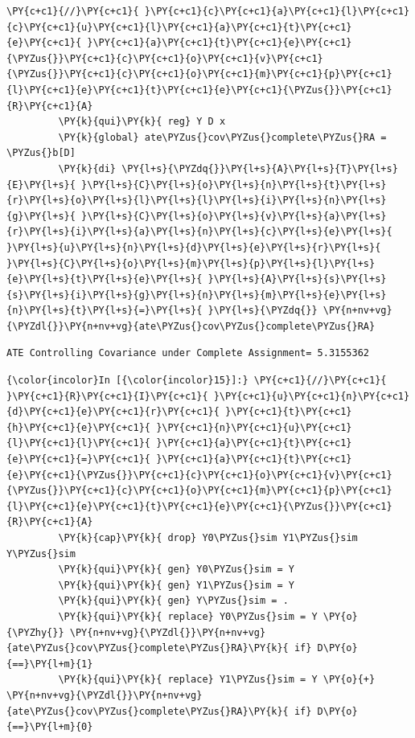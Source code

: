 \documentclass[11pt,notitlepage]{article}\usepackage[]{graphicx}\usepackage[]{color}
\makeatletter
\newenvironment{kframe}{%
 \def\at@end@of@kframe{}%
 \ifinner\ifhmode%
  \def\at@end@of@kframe{\end{minipage}}%
  \begin{minipage}{\columnwidth}%
 \fi\fi%
 \def\FrameCommand##1{\hskip\@totalleftmargin \hskip-\fboxsep
 \colorbox{shadecolor}{##1}\hskip-\fboxsep
     \hskip-\linewidth \hskip-\@totalleftmargin \hskip\columnwidth}%
 \MakeFramed {\advance\hsize-\width
   \@totalleftmargin\z@ \linewidth\hsize
   \@setminipage}}%
 {\par\unskip\endMakeFramed%
 \at@end@of@kframe}
\newenvironment{knitrout}{}{} %
\makeatother
\begin{document}
\begin{enumerate}[a)]
\begin{knitrout}
\begin{kframe}
\begin{Verbatim}[commandchars=\\\{\}]
         \PY{c+c1}{//}\PY{c+c1}{ }\PY{c+c1}{c}\PY{c+c1}{a}\PY{c+c1}{l}\PY{c+c1}{c}\PY{c+c1}{u}\PY{c+c1}{l}\PY{c+c1}{a}\PY{c+c1}{t}\PY{c+c1}{e}\PY{c+c1}{ }\PY{c+c1}{a}\PY{c+c1}{t}\PY{c+c1}{e}\PY{c+c1}{\PYZus{}}\PY{c+c1}{c}\PY{c+c1}{o}\PY{c+c1}{v}\PY{c+c1}{\PYZus{}}\PY{c+c1}{c}\PY{c+c1}{o}\PY{c+c1}{m}\PY{c+c1}{p}\PY{c+c1}{l}\PY{c+c1}{e}\PY{c+c1}{t}\PY{c+c1}{e}\PY{c+c1}{\PYZus{}}\PY{c+c1}{R}\PY{c+c1}{A}
         \PY{k}{qui}\PY{k}{ reg} Y D x
         \PY{k}{global} ate\PYZus{}cov\PYZus{}complete\PYZus{}RA = \PYZus{}b[D]
         \PY{k}{di} \PY{l+s}{\PYZdq{}}\PY{l+s}{A}\PY{l+s}{T}\PY{l+s}{E}\PY{l+s}{ }\PY{l+s}{C}\PY{l+s}{o}\PY{l+s}{n}\PY{l+s}{t}\PY{l+s}{r}\PY{l+s}{o}\PY{l+s}{l}\PY{l+s}{l}\PY{l+s}{i}\PY{l+s}{n}\PY{l+s}{g}\PY{l+s}{ }\PY{l+s}{C}\PY{l+s}{o}\PY{l+s}{v}\PY{l+s}{a}\PY{l+s}{r}\PY{l+s}{i}\PY{l+s}{a}\PY{l+s}{n}\PY{l+s}{c}\PY{l+s}{e}\PY{l+s}{ }\PY{l+s}{u}\PY{l+s}{n}\PY{l+s}{d}\PY{l+s}{e}\PY{l+s}{r}\PY{l+s}{ }\PY{l+s}{C}\PY{l+s}{o}\PY{l+s}{m}\PY{l+s}{p}\PY{l+s}{l}\PY{l+s}{e}\PY{l+s}{t}\PY{l+s}{e}\PY{l+s}{ }\PY{l+s}{A}\PY{l+s}{s}\PY{l+s}{s}\PY{l+s}{i}\PY{l+s}{g}\PY{l+s}{n}\PY{l+s}{m}\PY{l+s}{e}\PY{l+s}{n}\PY{l+s}{t}\PY{l+s}{=}\PY{l+s}{ }\PY{l+s}{\PYZdq{}} \PY{n+nv+vg}{\PYZdl{}}\PY{n+nv+vg}{ate\PYZus{}cov\PYZus{}complete\PYZus{}RA}
\end{Verbatim}

    \begin{Verbatim}[commandchars=\\\{\}]
ATE Controlling Covariance under Complete Assignment= 5.3155362
    \end{Verbatim}

    \begin{Verbatim}[commandchars=\\\{\}]
{\color{incolor}In [{\color{incolor}15}]:} \PY{c+c1}{//}\PY{c+c1}{ }\PY{c+c1}{R}\PY{c+c1}{I}\PY{c+c1}{ }\PY{c+c1}{u}\PY{c+c1}{n}\PY{c+c1}{d}\PY{c+c1}{e}\PY{c+c1}{r}\PY{c+c1}{ }\PY{c+c1}{t}\PY{c+c1}{h}\PY{c+c1}{e}\PY{c+c1}{ }\PY{c+c1}{n}\PY{c+c1}{u}\PY{c+c1}{l}\PY{c+c1}{l}\PY{c+c1}{ }\PY{c+c1}{a}\PY{c+c1}{t}\PY{c+c1}{e}\PY{c+c1}{=}\PY{c+c1}{ }\PY{c+c1}{a}\PY{c+c1}{t}\PY{c+c1}{e}\PY{c+c1}{\PYZus{}}\PY{c+c1}{c}\PY{c+c1}{o}\PY{c+c1}{v}\PY{c+c1}{\PYZus{}}\PY{c+c1}{c}\PY{c+c1}{o}\PY{c+c1}{m}\PY{c+c1}{p}\PY{c+c1}{l}\PY{c+c1}{e}\PY{c+c1}{t}\PY{c+c1}{e}\PY{c+c1}{\PYZus{}}\PY{c+c1}{R}\PY{c+c1}{A}
         \PY{k}{cap}\PY{k}{ drop} Y0\PYZus{}sim Y1\PYZus{}sim Y\PYZus{}sim
         \PY{k}{qui}\PY{k}{ gen} Y0\PYZus{}sim = Y
         \PY{k}{qui}\PY{k}{ gen} Y1\PYZus{}sim = Y
         \PY{k}{qui}\PY{k}{ gen} Y\PYZus{}sim = .
         \PY{k}{qui}\PY{k}{ replace} Y0\PYZus{}sim = Y \PY{o}{\PYZhy{}} \PY{n+nv+vg}{\PYZdl{}}\PY{n+nv+vg}{ate\PYZus{}cov\PYZus{}complete\PYZus{}RA}\PY{k}{ if} D\PY{o}{==}\PY{l+m}{1}
         \PY{k}{qui}\PY{k}{ replace} Y1\PYZus{}sim = Y \PY{o}{+} \PY{n+nv+vg}{\PYZdl{}}\PY{n+nv+vg}{ate\PYZus{}cov\PYZus{}complete\PYZus{}RA}\PY{k}{ if} D\PY{o}{==}\PY{l+m}{0}
\end{Verbatim}


\end{kframe}
\end{knitrout}
\end{enumerate}
\end{document}
